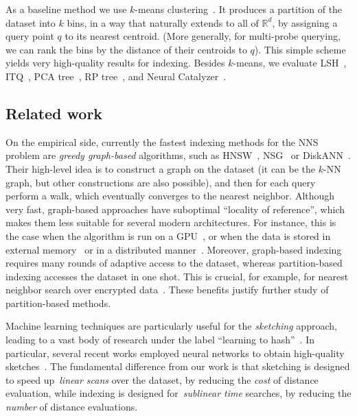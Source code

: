 \documentclass[11pt]{article}
\begin{document}
As a baseline method we use $k$-means clustering~\cite{jegou2011product}. It produces a partition of the dataset into $k$ bins, in a way that naturally extends to all of $\mathbb{R}^d$, by assigning a query point $q$ to its nearest centroid. (More generally, for multi-probe querying, we can rank the bins by the distance of their centroids to $q$). This simple scheme yields very high-quality results for indexing. Besides $k$-means, we evaluate LSH~\cite{andoni2015practical}, ITQ~\cite{gong2013iterative}, PCA tree~\cite{sproull1991refinements}, RP tree~\cite{dasgupta2013randomized}, and Neural Catalyzer~\cite{sablayrolles2018spreading}.

\subsection{Related work}\label{piotr_sec:related}



On the empirical side, currently the fastest indexing methods for the NNS problem are \emph{greedy graph-based} algorithms, such as HNSW~\cite{malkov2018efficient}, NSG~\cite{fu2019fast} or DiskANN~\cite{jayaram2019diskann}.
Their high-level idea is to construct a graph on the dataset
(it can be the $k$-NN graph, but other constructions are also possible), and then for each query perform a walk, which eventually converges to the nearest neighbor.
Although very fast, graph-based approaches have suboptimal ``locality of reference'', which makes them less suitable for several modern architectures. For instance, this is the case when the algorithm is run on a GPU~\cite{johnson2017billion}, or when the data is stored in external memory~\cite{sun2014srs} or in a distributed manner~\cite{bahmani2012efficient,nidetecting}.
Moreover, graph-based indexing requires many rounds of adaptive access to the dataset, whereas partition-based indexing accesses the dataset in one shot.
This is crucial, for example, for nearest neighbor search over encrypted data~\cite{chen2019sanns}.
These benefits justify further study of partition-based methods.

Machine learning techniques are particularly useful for the \emph{sketching} approach, leading to a vast body of research 
under the label ``learning to hash''~\cite{wang2014hashing,wang2016learning}.
In particular, several recent works employed neural networks to obtain high-quality sketches~\cite{erin2015deep,sablayrolles2018spreading}.
The fundamental difference from our work is that sketching is designed to speed up~\emph{linear scans} over the dataset, by reducing the \emph{cost} of distance evaluation, while indexing is designed for~\emph{sublinear time} searches, by reducing the \emph{number} of distance evaluations.
\end{document}
